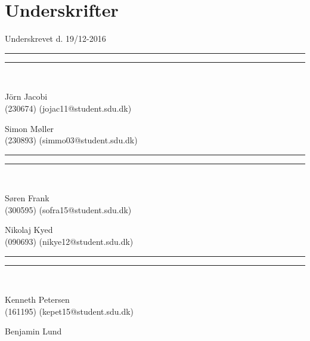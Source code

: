 
\section*{Underskrifter}
\vspace{3ex} \hfill Underskrevet d. 19/12-2016\\

\newlength{\streg} \setlength{\streg}{0.49\linewidth}
\vspace*{\fill} \rule{\streg}{1pt} \hfill \rule{\streg}{1pt}\\
\begin{minipage}[b]{\streg}
 \centering
 \rule{0pt}{4ex}
 J\"{o}rn Jacobi \\
 {\footnotesize (230674) (jojac11@student.sdu.dk)}
\end{minipage}
\hfill
\begin{minipage}[b]{\streg}
 \centering
 Simon Møller \\
 {\footnotesize (230893) (simmo03@student.sdu.dk)}
\end{minipage}

\vspace*{\fill} \rule{\streg}{1pt} \hfill \rule{\streg}{1pt}\\
\begin{minipage}[b]{\streg}
 \centering
 \rule{0pt}{4ex}
 Søren Frank \\
 {\footnotesize (300595) (sofra15@student.sdu.dk)}
\end{minipage}
\hfill
\begin{minipage}[b]{\streg}
 \centering
 Nikolaj Kyed \\
 {\footnotesize (090693) (nikye12@student.sdu.dk)}
\end{minipage}

\vspace*{\fill} \rule{\streg}{1pt} \hfill \rule{\streg}{1pt}\\
\begin{minipage}[b]{\streg}
	\centering
	\rule{0pt}{4ex}
	Kenneth Petersen \\
	{\footnotesize (161195) (kepet15@student.sdu.dk)}
\end{minipage}
\hfill
\begin{minipage}[b]{\streg}
	\centering
	Benjamin Lund \\
	\parbox{3cm}{}
\end{minipage}